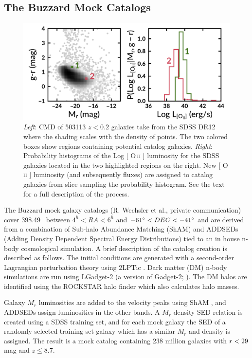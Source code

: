 \documentclass[fleqn,usenatbib]{mnras}
\makeatletter
\DeclareRobustCommand{\ion}[2]{%
\relax\ifmmode
\ifx\testbx\f@series
{\mathbf{#1\,\mathsc{#2}}}\else
{\mathrm{#1\,\mathsc{#2}}}\fi
\else\textup{#1\,{\mdseries\textsc{#2}}}%
\fi}
\makeatother
\begin{document}
\subsection{The Buzzard Mock Catalogs}
\begin{figure} 
	\includegraphics[width=\textwidth]{figures/oii_sdss.pdf} 
	\caption{\textit{Left}: CMD of 503113 $z<0.2$ galaxies take from the SDSS DR12 where the shading scales with the density of points. The two colored boxes show regions containing potential catalog galaxies. \textit{Right}: Probability histograms of the Log [\ion{O}{ii}] luminosity for the SDSS galaxies located in the two highlighted regions on the right. New [\ion{O}{ii}] luminosity (and subsequently fluxes) are assigned to catalog galaxies from slice sampling the probability histogram. See the text for a full description of the process.} \label{fig: oii sdss} 
\end{figure}

The Buzzard mock galaxy catalogs (R. Wechsler et al., private communication) cover 398.49 \degsq\ between $4^h< RA < 6^h$ and $-61\hbox{$^\circ$} < DEC < -41\hbox{$^\circ$}$ and are derived from a combination of Sub-halo Abundance Matching (ShAM) and ADDSEDs (Adding Density Dependent Spectral Energy Distributions) tied to an in house n-body cosmological simulation. A brief description of the catalog creation is described as follows. The initial conditions are generated with a second-order Lagrangian perturbation theory using {\sc 2LPTic} \citep{Crocce2006}. Dark matter (DM) n-body simulations are run using {\sc LGadget-2} (a version of {\sc Gadget-2}; \citealt{Springel2005}). The DM halos are identified using the {\sc ROCKSTAR} halo finder \citep{Behroozi2013} which also calculates halo masses. 

Galaxy $M_r$ luminosities are added to the velocity peaks using ShAM \citep{Reddick2013}, and ADDSEDs assign luminosities in the other bands. A $M_r$-density-SED relation is created using a SDSS training set, and for each mock galaxy the SED of a randomly selected training set galaxy which has a similar $M_r$ and density is assigned. The result is a mock catalog containing 238 million galaxies with $\hbox{$r$} < 29$ mag and $z \leq 8.7$.
\end{document}
